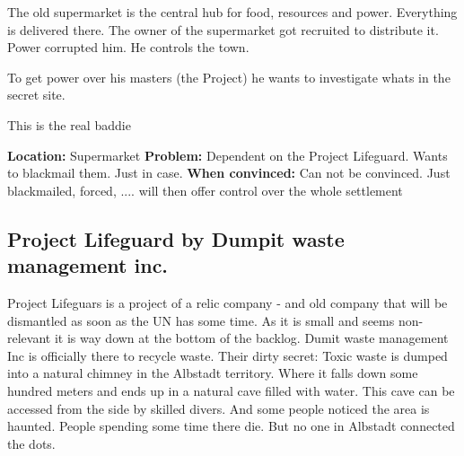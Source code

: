 \newpage
\begin{npcBox}[title=Ash continued]
    
    \begin{stressSection}
    \end{stressSection}
    \begin{tabularx}{\textwidth}{ XX }
    \end{tabularx}
    
    \begin{consequences}
    \item {}
    \item {}
    \item {}
    \end{consequences}
    
    \begin{npcDescription}
    The old supermarket is the central hub for food, resources and power. Everything is delivered there. The owner of the supermarket got recruited to distribute it. Power corrupted him. He controls the town.

    To get power over his masters (the Project) he wants to investigate whats in the secret site.
    
    This is the real baddie

    \textbf{Location:} Supermarket
    \textbf{Problem:} Dependent on the Project Lifeguard. Wants to blackmail them. Just in case.
    \textbf{When convinced:} Can not be convinced. Just blackmailed, forced, .... will then offer control over the whole settlement
    \end{npcDescription}
    
\end{npcBox}




\subsection{Project Lifeguard by Dumpit waste management inc.}

Project Lifeguars is a project of a relic company - and old company that will be dismantled as soon as the UN has some time. As it is small and seems non-relevant it is way down at the bottom of the backlog.
Dumit waste management Inc is officially there to recycle waste. Their dirty secret: Toxic waste is dumped into a natural chimney in the Albstadt territory. Where it falls down some hundred meters and ends up in a natural cave filled with water. This cave can be accessed from the side by skilled divers. And some people noticed the area is haunted. People spending some time there die. But no one in Albstadt connected the dots.


